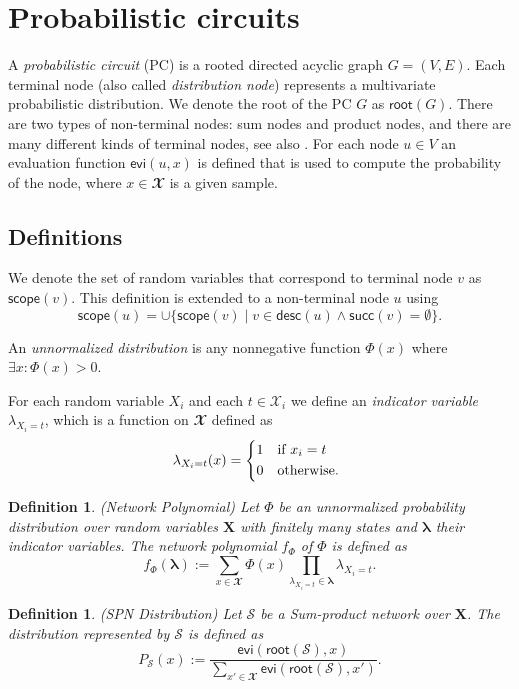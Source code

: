 \documentclass{article}
\newtheorem{definition}[theorem]{Definition}
\newcommand{\func}[1]{\ensuremath{\textsf{#1}}} %
\begin{document}
\clearpage
\section{Probabilistic circuits}
A \emph{probabilistic circuit} (PC) is a rooted directed acyclic graph $G = (V,E)$. Each terminal node (also called \emph{distribution node}) represents a multivariate probabilistic distribution. We denote the root of the PC $G$ as $\func{root}(G)$. There are two types of non-terminal nodes: sum nodes and product nodes, and there are many different kinds of terminal nodes, see also \cite{ProbCirc20}. 
For each node $u \in V$ an evaluation function $\func{evi}(u,x)$ is defined that is used to compute the probability of the node, where $x \in \mathbfcal{X}$ is a given sample.

\subsection{Definitions}
We denote the set of random variables that correspond to terminal node $v$ as $\func{scope}(v)$. This definition is extended to a non-terminal node $u$ using
\[
\func{scope}(u) = \cup \{ \func{scope}(v) \mid v \in \func{desc}(u) \land \func{succ}(v) = \emptyset \}.
\]

\noindent
An \emph{unnormalized distribution} is any nonnegative function $\Phi(x)$ where $\exists x: \Phi(x) > 0$.

\vspace{0.5cm}
\noindent
For each random variable $X_i$ and each $t \in \mathcal{X}_i$ we define an
\emph{indicator variable} $\lambda_{X_i=t}$, which is a function on $\mathbfcal{X}$ defined as
\[
  \lambda_{X_i=t}(x) =
  \begin{cases*}
    1 & if $x_i = t$ \\
    0 & otherwise.
  \end{cases*}
\]

\begin{definition}(Network Polynomial) Let $\Phi$ be an unnormalized probability distribution over random variables $\mathbf{X}$ with finitely many states and $\bm{\lambda}$ their indicator variables. The network polynomial $f_\Phi$ of $\Phi$ is defined as
\[
f_\Phi(\bm{\lambda}) := \sum\limits_{x \in \mathbfcal{X}} \Phi(x) \prod\limits_{\lambda_{X_i=t} \in \bm{\lambda}} \lambda_{X_i=t}.
\]
\end{definition}

\begin{definition}(SPN Distribution) Let $\mathcal{S}$ be a Sum-product network over $\mathbf{X}$. The distribution represented by $\mathcal{S}$ is defined as
\[
P_\mathcal{S}(x) := \frac{\func{evi}(\func{root}(\mathcal{S}), x)}
{\sum\limits_{x' \in \mathbfcal{X}} \func{evi}(\func{root}(\mathcal{S}), x')}.
\]
\end{definition}
\end{document}
